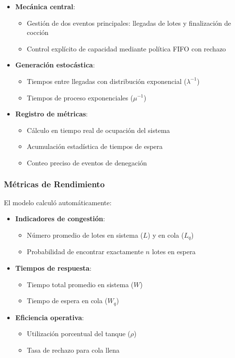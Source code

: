 \documentclass{article}
\begin{document}
\begin{itemize}
    \item \textbf{Mecánica central}:
    \begin{itemize}
        \item Gestión de dos eventos principales: llegadas de lotes y finalización de cocción
        \item Control explícito de capacidad mediante política FIFO con rechazo
    \end{itemize}
   
    \item \textbf{Generación estocástica}:
    \begin{itemize}
        \item Tiempos entre llegadas con distribución exponencial ($\lambda^{-1}$)
        \item Tiempos de proceso exponenciales ($\mu^{-1}$)
    \end{itemize}
   
    \item \textbf{Registro de métricas}:
    \begin{itemize}
        \item Cálculo en tiempo real de ocupación del sistema
        \item Acumulación estadística de tiempos de espera
        \item Conteo preciso de eventos de denegación
    \end{itemize}
\end{itemize}


\subsubsection{Métricas de Rendimiento}
El modelo calculó automáticamente:


\begin{itemize}
    \item \textbf{Indicadores de congestión}:
    \begin{itemize}
        \item Número promedio de lotes en sistema ($L$) y en cola ($L_q$)
        \item Probabilidad de encontrar exactamente $n$ lotes en espera
    \end{itemize}
   
    \item \textbf{Tiempos de respuesta}:
    \begin{itemize}
        \item Tiempo total promedio en sistema ($W$)
        \item Tiempo de espera en cola ($W_q$)
    \end{itemize}
   
    \item \textbf{Eficiencia operativa}:
    \begin{itemize}
        \item Utilización porcentual del tanque ($\rho$)
        \item Tasa de rechazo para cola llena
    \end{itemize}
\end{itemize}
\end{document}
